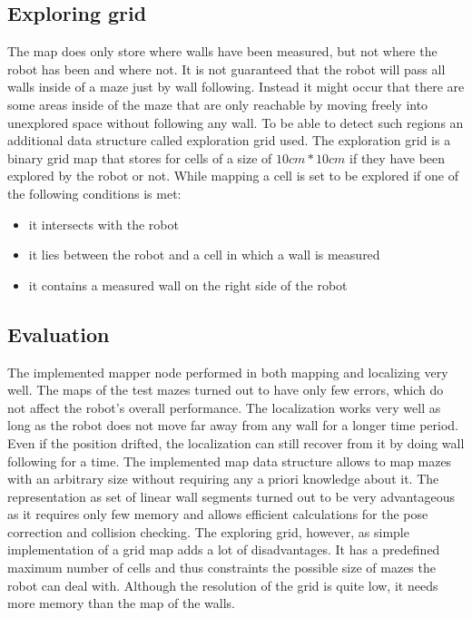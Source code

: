 \subsection{Exploring grid}
The map does only store where walls have been measured, but not where the robot 
has been and where not. It is not guaranteed that the robot will pass all walls inside
of a maze just by wall following. Instead it might occur that there are some areas inside of the
maze that are only reachable by moving freely into unexplored space without following any wall.
To be able to detect such regions an additional data structure called exploration grid used.
The exploration grid is a binary grid map that stores for cells of a size of
$10cm*10cm$ if they have been explored by the robot or not.
While mapping a cell is set to be explored if one of the following conditions is met:

\begin{itemize}
\item it intersects with the robot
\item it lies between the robot and a cell in which a wall is measured
\item it contains a measured wall on the right side of the robot
\end{itemize}



\subsection{Evaluation}

The implemented mapper node performed in both mapping and localizing very well. The maps of the test mazes turned out to have only few errors, which do not affect the robot’s overall performance. The localization works very well as long as the robot does not move far away from any wall for a longer time period. 
Even if the position drifted, the localization can still recover from it by doing wall following for a time.
The implemented map data structure allows to map mazes with an arbitrary size without requiring any a priori knowledge about it. The representation as set of linear wall segments turned out to be very advantageous as it requires only few memory and allows efficient calculations for the pose correction and collision checking. 
The exploring grid, however, as simple implementation of a grid map adds a lot of disadvantages. It has a predefined maximum number of cells and thus constraints the possible size of mazes the robot can deal with. Although the resolution of the grid is quite low, it needs more memory than the map of the walls.

